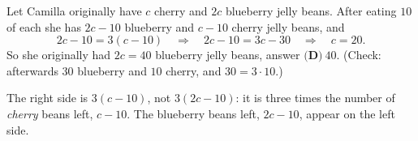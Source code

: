 Let Camilla originally have $c$ cherry and $2c$ blueberry jelly beans. After eating $10$ of each she has $2c-10$ blueberry and $c-10$ cherry jelly beans, and
\[2c-10=3(c-10)\quad\Longrightarrow\quad2c-10=3c-30\quad\Longrightarrow\quad c=20.\]
So she originally had $2c=40$ blueberry jelly beans, answer $\boxed{\textbf{(D)}\ 40}$. (Check: afterwards $30$ blueberry and $10$ cherry, and $30=3\cdot10$.)

The right side is $3(c-10)$, not $3(2c-10)$: it is three times the number of \emph{cherry} beans left, $c-10$. The blueberry beans left, $2c-10$, appear on the left side.
